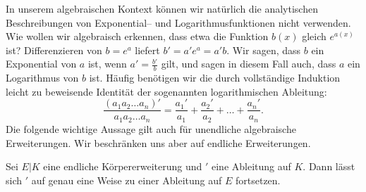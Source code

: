 \documentclass[12pt,a4paper,twoside]{article}
\begin{document}
In unserem algebraischen Kontext k\"onnen wir nat\"urlich die analytischen
Beschreibungen von Exponential-- und Logarithmusfunktionen nicht
verwenden. Wie wollen wir algebraisch erkennen, dass etwa die Funktion $b(x)$
gleich $e^{a(x)}$ ist? Differenzieren von $b=e^a$ liefert $b'=a'e^a=a'b$. Wir
sagen, dass $b$ ein Exponential von $a$ ist, wenn $a'=\frac{b'}{b}$ gilt, und
sagen in diesem Fall auch, dass $a$ ein Logarithmus von $b$ ist. H\"aufig
ben\"otigen wir die durch vollst\"andige Induktion leicht zu beweisende
Identit\"at der sogenannten logarithmischen Ableitung:
\[
\frac{(a_1a_2\dots a_n)'}{a_1a_2\dots a_n}=
\frac{a_1'}{a_1}+\frac{a_2'}{a_2}+\dots+\frac{a_n'}{a_n}.
\]
Die folgende wichtige Aussage gilt auch f\"ur unendliche algebraische
Erweiterungen. Wir beschr\"anken uns aber auf endliche Erweiterungen.
\begin{Satz}
  Sei $E|K$ eine endliche K\"orpererweiterung und $'$ eine Ableitung auf
  $K$. Dann l\"asst sich $'$ auf genau eine Weise zu einer Ableitung
  auf $E$ fortsetzen.
\end{Satz}
\end{document}

